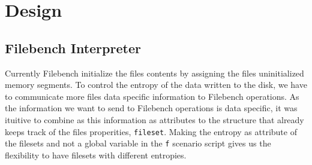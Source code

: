 \chapter{Design}\label{chap:des}

\section{Filebench Interpreter}
\noindent Currently Filebench initialize the files contents by assigning the files uninitialized memory segments.
 To control the entropy of the data written to the disk, we have to communicate more files data specific information to Filebench operations.
\newline
\noindent As the information we want to send to Filebench operations is data specific, it was ituitive to combine as this information as attributes to the structure that already keeps track of the files properities, \verb+fileset+.
Making the entropy as attribute of the filesets and not a global variable in the \verb+f+ scenario script gives us the flexibility to have filesets with different entropies.

